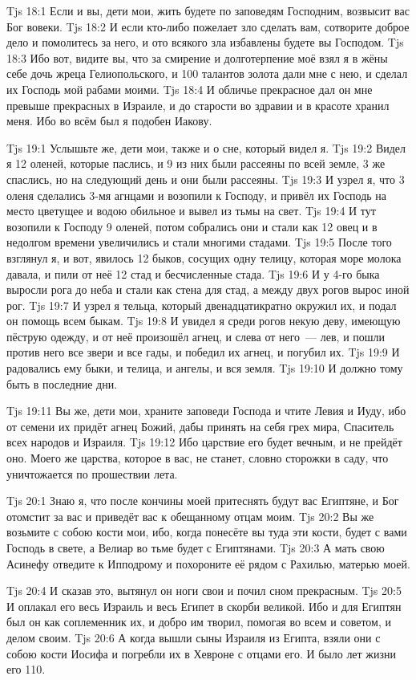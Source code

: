 \vs Tjs 18:1
Если и вы, дети мои, жить будете по заповедям Господним,
возвысит вас Бог вовеки.
\vs Tjs 18:2
И если кто-либо пожелает зло сделать вам,
сотворите доброе дело и помолитесь за него,
и ото всякого зла избавлены будете вы Господом.
\vs Tjs 18:3
Ибо вот, видите вы, что за смирение и долготерпение
моё взял я в жёны себе дочь жреца Гелиопольского,
и 100 талантов золота дали мне с нею,
и сделал их Господь мой рабами моими.
\vs Tjs 18:4
И обличье прекрасное дал он мне превыше прекрасных в Израиле,
и до старости во здравии и в красоте хранил меня.
Ибо во всём был я подобен Иакову.

\vs Tjs 19:1
Услышьте же, дети мои, также и о сне, который видел я.
\vs Tjs 19:2
Видел я 12 оленей, которые паслись,
и 9 из них были рассеяны по всей земле,
3 же спаслись, но на следующий день и они были рассеяны.
\vs Tjs 19:3
И узрел я, что 3 оленя сделались 3-мя агнцами и возопили к Господу,
и привёл их Господь на место цветущее и водою обильное
и вывел из тьмы на свет.
\vs Tjs 19:4
И тут возопили к Господу 9 оленей,
потом собрались они и стали как 12 овец
и в недолгом времени увеличились
и стали многими стадами.
\vs Tjs 19:5
После того взглянул я, и вот, явилось 12 быков,
сосущих одну телицу, которая море молока давала,
и пили от неё 12 стад и бесчисленные стада.
\vs Tjs 19:6
И у 4-го быка выросли рога до неба и стали
как стена для стад, а между двух рогов вырос иной рог.
\vs Tjs 19:7
И узрел я тельца, который двенадцатикратно окружил их,
и подал он помощь всем быкам.
\vs Tjs 19:8
И увидел я среди рогов некую деву,
имеющую пёструю одежду,
и от неё произошёл агнец,
и слева от него~--- лев,
и пошли против него все звери и все гады,
и победил их агнец, и погубил их.
\vs Tjs 19:9
И радовались ему быки, и телица, и ангелы, и вся земля.
\vs Tjs 19:10
И должно тому быть в последние дни.

\vs Tjs 19:11
Вы же, дети мои, храните заповеди Господа и чтите Левия и Иуду,
ибо от семени их придёт агнец Божий, дабы принять на себя грех мира,
Спаситель всех народов и Израиля.
\vs Tjs 19:12
Ибо царствие его будет вечным, и не прейдёт оно.
Моего же царства, которое в вас, не станет,
словно сторожки в саду, что уничтожается по прошествии лета.

\vs Tjs 20:1
Знаю я, что после кончины моей притеснять будут вас Египтяне,
и Бог отомстит за вас и приведёт вас к обещанному отцам моим.
\vs Tjs 20:2
Вы же возьмите с собою кости мои, ибо,
когда понесёте вы туда эти кости,
будет с вами Господь в свете, а Велиар во тьме будет с Египтянами.
\vs Tjs 20:3
А мать свою Асинефу отведите к Ипподрому и похороните её рядом с Рахилью,
матерью моей.

\vs Tjs 20:4
И сказав это, вытянул он ноги свои и почил сном прекрасным.
\vs Tjs 20:5
И оплакал его весь Израиль и весь Египет в скорби великой.
Ибо и для Египтян был он как соплеменник их,
и добро им творил, помогая во всем и советом, и делом своим.
\vs Tjs 20:6
А когда вышли сыны Израиля из Египта,
взяли они с собою кости Иосифа и погребли их
в Хевроне с отцами его.
И было лет жизни его 110.
